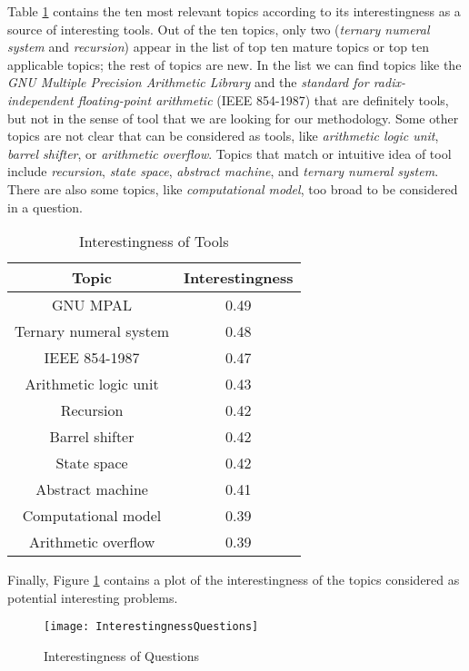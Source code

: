 Table \ref{tab:Interestingness-of-Tools} contains the ten most relevant
topics according to its interestingness as a source of interesting
tools. Out of the ten topics, only two (\emph{ternary numeral system}
and \emph{recursion}) appear in the list of top ten mature topics
or top ten applicable topics; the rest of topics are new. In the list
we can find topics like the \emph{GNU Multiple Precision Arithmetic
Library} and the \emph{standard for radix-independent floating-point
arithmetic} (IEEE 854-1987) that are definitely tools, but not in
the sense of tool that we are looking for our methodology. Some other
topics are not clear that can be considered as tools, like \emph{arithmetic
logic unit}, \emph{barrel shifter}, or \emph{arithmetic overflow}.
Topics that match or intuitive idea of tool include \emph{recursion},
\emph{state space}, \emph{abstract machine}, and \emph{ternary numeral
system}. There are also some topics, like \emph{computational model},
too broad to be considered in a question.

\begin{table}
\begin{centering}
\begin{tabular}{|c|c|}
\hline 
Topic & Interestingness\tabularnewline
\hline 
\hline 
GNU MPAL & 0.49\tabularnewline
\hline 
Ternary numeral system & 0.48\tabularnewline
\hline 
IEEE 854-1987 & 0.47\tabularnewline
\hline 
Arithmetic logic unit & 0.43\tabularnewline
\hline 
Recursion & 0.42\tabularnewline
\hline 
Barrel shifter & 0.42\tabularnewline
\hline 
State space & 0.42\tabularnewline
\hline 
Abstract machine & 0.41\tabularnewline
\hline 
Computational model & 0.39\tabularnewline
\hline 
Arithmetic overflow & 0.39\tabularnewline
\hline 
\end{tabular}
\par\end{centering}

\caption{\label{tab:Interestingness-of-Tools}Interestingness of Tools}
\end{table}

Finally, Figure \ref{fig:Interestingness-of-Questions} contains a
plot of the interestingness of the topics considered as potential
interesting problems.

\begin{figure}[h]
\centering\texttt{[image: InterestingnessQuestions]}
\caption{\label{fig:Interestingness-of-Questions}Interestingness of Questions}
\end{figure}

